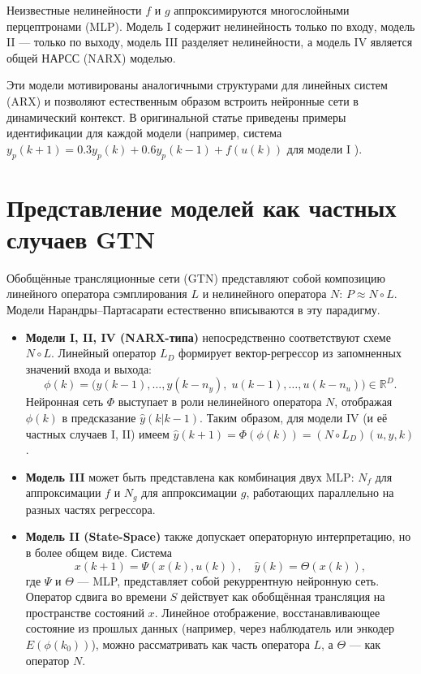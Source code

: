 \documentclass[12pt]{article}
\begin{document}
Неизвестные нелинейности \(f\) и \(g\) аппроксимируются многослойными перцептронами (MLP). Модель I содержит нелинейность только по входу, модель II --- только по выходу, модель III разделяет нелинейности, а модель IV является общей НАРСС (NARX) моделью.

Эти модели мотивированы аналогичными структурами для линейных систем (ARX) и позволяют естественным образом встроить нейронные сети в динамический контекст. В оригинальной статье приведены примеры идентификации для каждой модели (например, система \(y_p(k+1) = 0.3y_p(k) + 0.6y_p(k-1) + f(u(k))\) для модели I \cite{Narendra1990}).

\section{Представление моделей как частных случаев GTN}

Обобщённые трансляционные сети (GTN) представляют собой композицию линейного оператора сэмплирования \(L\) и нелинейного оператора \(N\): \(P \approx N \circ L\). Модели Нарандры–Партасарати естественно вписываются в эту парадигму.

\begin{itemize}
  \item \textbf{Модели I, II, IV (NARX-типа)} непосредственно соответствуют схеме \(N \circ L\). Линейный оператор \(L_D\) формирует вектор-регрессор из запомненных значений входа и выхода:
        \[
          \phi(k) = \big( y(k-1), \dots, y(k-n_y),\; u(k-1), \dots, u(k-n_u) \big) \in \mathbb{R}^{D}.
        \]
        Нейронная сеть \(\Phi\) выступает в роли нелинейного оператора \(N\), отображая \(\phi(k)\) в предсказание \(\hat{y}(k|k-1)\). Таким образом, для модели IV (и её частных случаев I, II) имеем \(\hat{y}(k+1) = \Phi(\phi(k)) = (N \circ L_D)(u, y, k)\).

  \item \textbf{Модель III} может быть представлена как комбинация двух MLP: \(N_f\) для аппроксимации \(f\) и \(N_g\) для аппроксимации \(g\), работающих параллельно на разных частях регрессора.

  \item \textbf{Модель II (State-Space)} также допускает операторную интерпретацию, но в более общем виде. Система
        \[
          x(k+1) = \Psi(x(k), u(k)), \quad \hat{y}(k) = \Theta(x(k)),
        \]
        где \(\Psi\) и \(\Theta\) --- MLP, представляет собой рекуррентную нейронную сеть. Оператор сдвига во времени \(S\) действует как обобщённая трансляция на пространстве состояний \(x\). Линейное отображение, восстанавливающее состояние из прошлых данных (например, через наблюдатель или энкодер \(E(\phi(k_0))\)), можно рассматривать как часть оператора \(L\), а \(\Theta\) --- как оператор \(N\).
\end{itemize}
\end{document}
